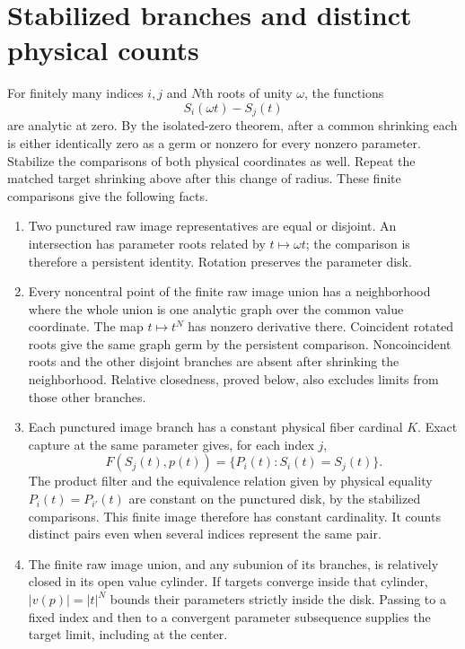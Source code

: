 \documentclass[11pt]{article}
\numberwithin{equation}{section}
\begin{document}
\section{Stabilized branches and distinct physical counts}
\label{sec:stabilization}

For finitely many indices $i,j$ and $N$th roots of unity $\omega$, the
functions
\[
 S_i(\omega t)-S_j(t)
\]
are analytic at zero. By the isolated-zero theorem, after a common shrinking
each is either identically zero as a germ or nonzero for every nonzero
parameter. Stabilize the comparisons of both physical coordinates as well.
Repeat the matched target shrinking above after this change of radius.
These finite comparisons give the following facts.

\begin{enumerate}
\item Two punctured raw image representatives are equal or disjoint.
An intersection has parameter roots related by $t\mapsto\omega t$;
the comparison is therefore a persistent identity. Rotation preserves
the parameter disk.

\item Every noncentral point of the finite raw image union has a
neighborhood where the whole union is one analytic graph over the common
value coordinate. The map $t\mapsto t^N$ has nonzero derivative there.
Coincident rotated roots give the same graph germ by the persistent
comparison. Noncoincident roots and the other disjoint branches are absent
after shrinking the neighborhood. Relative closedness, proved below,
also excludes limits from those other branches.

\item Each punctured image branch has a constant physical fiber cardinal
$K$. Exact capture at the same parameter gives, for each index $j$,
\begin{equation}\label{eq:exact-fiber}
 F(S_j(t),p(t))=\{P_i(t):S_i(t)=S_j(t)\}.
\end{equation}
The product filter and the equivalence relation given by physical equality
$P_i(t)=P_{i'}(t)$ are constant on the punctured disk, by the stabilized
comparisons. This finite image therefore has constant cardinality. It
counts distinct pairs even when several indices represent the same pair.

\item The finite raw image union, and any subunion of its branches, is
relatively closed in its open value cylinder. If targets converge inside
that cylinder, $|v(p)|=|t|^N$ bounds their parameters strictly inside the
disk. Passing to a fixed index and then to a convergent parameter
subsequence supplies the target limit, including at the center.
\end{enumerate}
\end{document}
